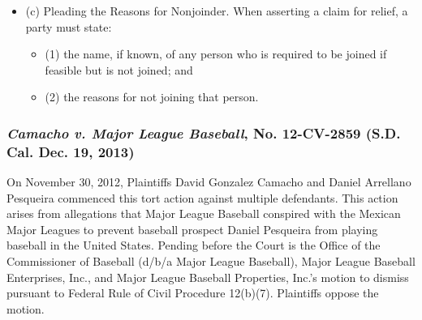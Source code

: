 \documentclass[11pt,letterpaper,twoside]{article}
\providecommand{\tightlist}{%
\setlength{\itemsep}{0em}\setlength{\parskip}{0em}\setlength{\itemindent}{0em}}
\begin{document}
\begin{itemize}
  \begin{itemize}
  \tightlist
  \item
    (1) the extent to which a judgment rendered in the person's absence
    might prejudice that person or the existing parties;
  \item
    (2) the extent to which any prejudice could be lessened or avoided
    by:

    \begin{itemize}
    \tightlist
    \item
      (A) protective provisions in the judgment;
    \item
      (B) shaping the relief; or
    \item
      (C) other measures;
    \end{itemize}
  \item
    (3) whether a judgment rendered in the person's absence would be
    adequate; and
  \item
    (4) whether the plaintiff would have an adequate remedy if the
    action were dismissed for nonjoinder.
  \end{itemize}
\item
  (c) Pleading the Reasons for Nonjoinder. When asserting a claim for
  relief, a party must state:

  \begin{itemize}
  \tightlist
  \item
    (1) the name, if known, of any person who is required to be joined
    if feasible but is not joined; and
  \item
    (2) the reasons for not joining that person.
  \end{itemize}
\end{itemize}

\subsubsection{\texorpdfstring{\emph{Camacho v. Major League Baseball},
No. 12-CV-2859 (S.D. Cal. Dec. 19,
2013)}{Camacho v. Major League Baseball, No. 12-CV-2859 (S.D. Cal. Dec. 19, 2013)}}\label{camachomajorleaguebaseball_sdcal2013}

On November 30, 2012, Plaintiffs David Gonzalez Camacho and Daniel
Arrellano Pesqueira commenced this tort action against multiple
defendants. This action arises from allegations that Major League
Baseball conspired with the Mexican Major Leagues to prevent baseball
prospect Daniel Pesqueira from playing baseball in the United States.
Pending before the Court is the Office of the Commissioner of Baseball
(d/b/a Major League Baseball), Major League Baseball Enterprises, Inc.,
and Major League Baseball Properties, Inc.'s motion to dismiss pursuant
to Federal Rule of Civil Procedure 12(b)(7). Plaintiffs oppose the
motion.
\end{document}
